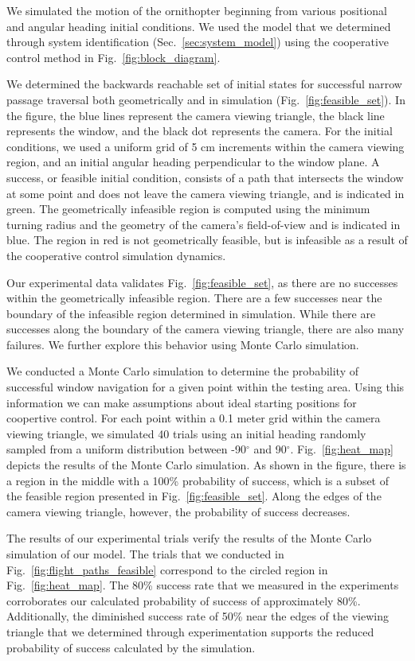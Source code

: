 \documentclass{aamas2013}
\begin{document}
We simulated the motion of the ornithopter beginning from various positional
and angular heading initial conditions.
We used the model that we determined through system identification (Sec.~\ref{sec:system_model}) using the cooperative control method in Fig.~\ref{fig:block_diagram}.

We determined the backwards reachable set of initial states for successful
narrow passage traversal both geometrically and in simulation
(Fig.~\ref{fig:feasible_set}). In the figure, the blue lines represent the camera viewing triangle, the black line
represents the window, and the black dot represents the camera. For the initial conditions, we used a uniform
grid of 5 cm increments within the camera viewing region, and an initial
angular heading perpendicular to the window plane. A success, or feasible initial condition, consists
of a path that intersects the window at some point and does not leave the
camera viewing triangle, and is indicated in green. The geometrically
infeasible region is computed using the minimum turning radius and the
geometry of the camera's field-of-view and is indicated in blue. The region in red is not geometrically feasible, but is infeasible as a result of the cooperative control simulation dynamics.

Our experimental data validates Fig.~\ref{fig:feasible_set}, as there are no successes within the geometrically
infeasible region. There are a few successes near the boundary of the
infeasible region determined in simulation. While there are successes along the boundary of the camera viewing triangle, there are also many failures. We further explore this behavior using Monte Carlo simulation.

We conducted a Monte Carlo simulation to determine the probability of successful window navigation for a given point within the testing area. Using this information we can make assumptions about ideal starting positions for coopertive control. For each point within a 0.1 meter grid within the camera viewing triangle, we simulated
40 trials using an initial heading randomly sampled from a uniform
distribution between -90$^{\circ}$ and 90$^{\circ}$.
Fig.~\ref{fig:heat_map} depicts the results of the Monte Carlo simulation. As shown in the figure,
there is a region in the middle with a 100\% probability of success, which is
a subset of the feasible region presented in Fig.~\ref{fig:feasible_set}.
Along the edges of the camera viewing triangle, however, the probability of
success decreases.

The results of our experimental trials verify the results of the Monte Carlo
simulation of our model. The trials that we conducted in
Fig.~\ref{fig:flight_paths_feasible} correspond to the circled region in
Fig.~\ref{fig:heat_map}. The 80\% success rate that we measured in the
experiments corroborates our calculated probability of success of
approximately 80\%. Additionally, the diminished success rate of 50\% near the
edges of the viewing triangle that we determined through experimentation
supports the reduced probability of success calculated by the simulation.
\end{document}

